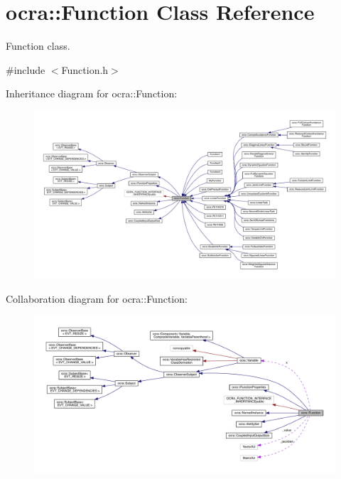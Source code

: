 \hypertarget{classocra_1_1Function}{}\section{ocra\+:\+:Function Class Reference}
\label{classocra_1_1Function}


Function class.  




{\ttfamily \#include $<$Function.\+h$>$}



Inheritance diagram for ocra\+:\+:Function\+:\nopagebreak
\begin{figure}[H]
\begin{center}
\leavevmode
\includegraphics[width=350pt]{da/d72/classocra_1_1Function__inherit__graph}
\end{center}
\end{figure}


Collaboration diagram for ocra\+:\+:Function\+:\nopagebreak
\begin{figure}[H]
\begin{center}
\leavevmode
\includegraphics[width=350pt]{d5/d4a/classocra_1_1Function__coll__graph}
\end{center}
\end{figure}
